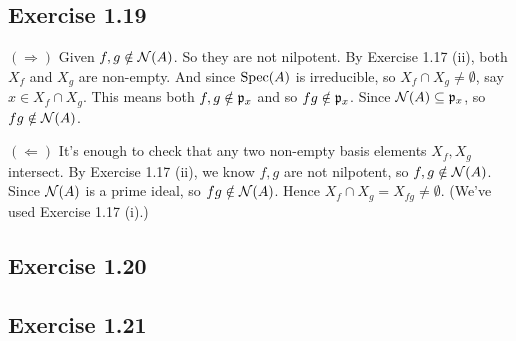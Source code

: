 \documentclass[../A&M.tex]{subfiles}
\begin{document}
\subsection*{Exercise 1.19}

$(\Rightarrow)$ Given $f,g\notin\mathcal{N}(A)$. So they are not nilpotent. By Exercise 1.17 (ii), both $X_f$ and $X_g$ are non-empty. And since $\operatorname{Spec}(A)$ is irreducible, so $X_f \cap X_g \neq \emptyset$, say $x\in X_f \cap X_g$. This means both $f,g\notin\mathfrak{p}_x$ and so $fg\notin\mathfrak{p}_x$. Since $\mathcal{N}(A)\subseteq \mathfrak{p}_x$, so $fg\notin\mathcal{N}(A)$.

$(\Leftarrow)$ It's enough to check that any two non-empty basis elements $X_f,X_g$ intersect. By Exercise 1.17 (ii), we know $f,g$ are not nilpotent, so $f,g\notin\mathcal{N}(A)$. Since $\mathcal{N}(A)$ is a prime ideal, so $fg\notin\mathcal{N}(A)$. Hence $X_f \cap X_g = X_{fg}\neq\emptyset$. (We've used Exercise 1.17 (i).)

\subsection*{Exercise 1.20}

\subsection*{Exercise 1.21}

\begin{comment}
(i) $\qfk\in\phi^{*^{-1}}(X_f) \iff \phi^*(\qfk) = \phi^{-1}(\qfk) \in X_f \iff f\notin \phi^{-1}(\qfk) \iff \phi(f)\notin\qfk \iff \qfk\in Y_{\phi(f)}$.

(ii) Note that $\qfk\in\phi^{*^{-1}}(V(\afk)) \iff \phi^*(\qfk) = \phi^{-1}(\qfk) =\qfk^c \in V(\afk) \iff \afk\sbe q^c$. So it's remaining to show that $\afk\sbe \qfk^c$ if and only if $\afk^e \sbe \qfk$. By (1.17) (i), if $\afk\sbe\qfk^c$, then $\afk^e\sbe\qfk^{ce} \sbe \qfk$. And conversely, if $\afk^e \sbe \qfk$, then $\afk \sbe \afk^{ec} \sbe \qfk^c$.

(iii) First, we claim that $\phi^*(V(\bfk)) \sbe V(\bfk^c)$. (Then $\ovl{\phi^*(V(\bfk))}  \sbe V(\bfk^c)$.) If $\pfk \in \phi^*(V(\bfk))$, then there exists $\qfk\spe\bfk$ s.t. $\phi^*(\qfk)=\pfk$. So $\bfk^c \sbe \qfk^c = \phi^{-1}(\qfk) = \phi^*(\qfk)=\pfk$ and hence $\pfk\in V(\bfk^c)$.

Conversely, let $V(\afk)$ be any closed set s.t. $\phi^*(V(\bfk)) \sbe V(\afk)$. We claim that $V(\bfk^c) \sbe V(\afk)$. (Then $\ovl{\phi^*(V(\bfk))}  \spe V(\bfk^c)$.) Given $\pfk \in V(\bfk^c)$. By Exercise 1.15 (i) and (1.18), we have $V(\bfk^c) = V(r(\bfk^c)) = V(r(\bfk)^c)$. So $\pfk\in V(r(\bfk)^c)$. By (1.14) and (1.13) (i),
$$
\pfk \spe r(\bfk)^c = \left( \bigcap_{\qfk \in V(\bfk)} \qfk \right)^c = \bigcap_{\qfk \in V(\bfk)} \qfk^c = \bigcap_{\qfk \in V(\bfk)} \phi^*(\qfk) = \bigcap_{\pfk \in \phi^*(V(\bfk))} \pfk \spe \bigcap_{\pfk \in V(\afk)} \pfk = r(\afk) \spe \afk 
$$
Thus, $\pfk\in V(\afk)$.
\end{comment}
\end{document}
